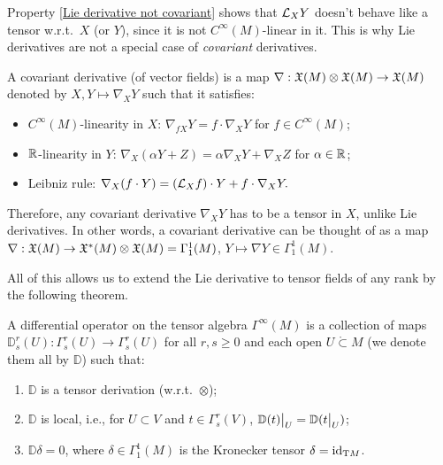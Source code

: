 \begin{rem}\label{rem: Lie derivatives not covariant}
    Property \eqref{Lie derivative not covariant} shows that $\mathcal{L}_X Y$ doesn't behave like a tensor w.r.t.\ $X$ (or $Y$), since it is not $C^\infty(M)$-linear in it. This is why Lie derivatives are not a special case of \emph{covariant} derivatives.
    
    A covariant derivative (of vector fields) is a map $\nabla:\mathfrak{X}(M)\otimes\mathfrak{X}(M)\to \mathfrak{X}(M)$ denoted by $X,Y\mapsto \nabla_X Y$ such that it satisfies:
    \begin{itemize}
        \item $C^\infty(M)$-linearity in $X$: $\nabla_{fX}Y=f\cdot \nabla_X Y$ for $f\in C^\infty(M)$;
        \item $\mathbb{R} $-linearity in $Y$: $\nabla_X (\alpha Y+Z)=\alpha \nabla_XY+\nabla_XZ$ for $\alpha\in\mathbb{R} $;
        \item Leibniz rule: $\nabla_X(f\cdot Y)=(\mathcal{L}_X f)\cdot Y+f\cdot \nabla_X Y.$
    \end{itemize}
    Therefore, any covariant derivative $\nabla_X Y$ has to be a tensor in $X$, unlike Lie derivatives. In other words, a covariant derivative can be thought of as a map $\nabla:\mathfrak{X}(M)\to \mathfrak{X}^\ast(M)\otimes\mathfrak{X}(M)=\Gamma^1_1(M)$, $Y\mapsto \nabla Y\in\Gamma^1_1(M)$.
\end{rem}

All of this allows us to extend the Lie derivative to tensor fields of any rank by the following theorem.

\begin{defn}
    A differential operator on the tensor algebra $\Gamma^\infty(M)$ is a collection of maps $\mathbb{D}^r_s(U):\Gamma^r_s(U)\to \Gamma^r_s(U)$ for all $r,s\geq 0$ and each open $U\mathring{\subset}M$ (we denote them all by $\mathbb{D}$) such that:
\begin{enumerate}
    \item $\mathbb{D}$ is a tensor derivation (w.r.t.\ $\otimes$);
    \item $\mathbb{D}$ is local, i.e., for $U\subset V$ and $t\in\Gamma^r_s(V)$, $\restr{\mathbb{D}(t)}{U}=\mathbb{D}(\restr{t}{U})$;
    \item $\mathbb{D} \delta=0$, where $\delta\in\Gamma^1_1(M)$ is the Kronecker tensor $\delta=\operatorname{id}_{\mathrm{T} M}$.
\end{enumerate}
\end{defn}

